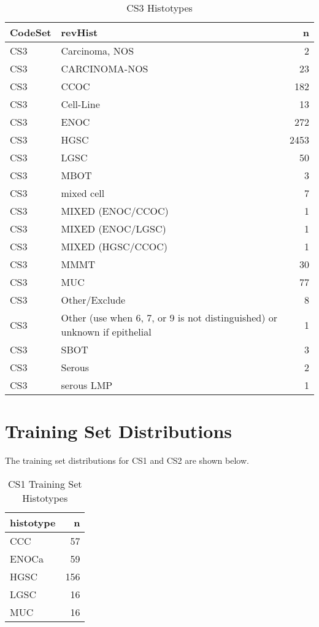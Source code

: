 \documentclass[
]{report}
\begin{document}
\begin{table}

\caption{\label{tab:dist-cs3}CS3 Histotypes}
\centering
\begin{tabular}[t]{l|l|r}
\hline
CodeSet & revHist & n\\
\hline
CS3 & Carcinoma, NOS & 2\\
\hline
CS3 & CARCINOMA-NOS & 23\\
\hline
CS3 & CCOC & 182\\
\hline
CS3 & Cell-Line & 13\\
\hline
CS3 & ENOC & 272\\
\hline
CS3 & HGSC & 2453\\
\hline
CS3 & LGSC & 50\\
\hline
CS3 & MBOT & 3\\
\hline
CS3 & mixed cell & 7\\
\hline
CS3 & MIXED (ENOC/CCOC) & 1\\
\hline
CS3 & MIXED (ENOC/LGSC) & 1\\
\hline
CS3 & MIXED (HGSC/CCOC) & 1\\
\hline
CS3 & MMMT & 30\\
\hline
CS3 & MUC & 77\\
\hline
CS3 & Other/Exclude & 8\\
\hline
CS3 & Other (use when 6, 7, or 9 is not distinguished) or unknown if epithelial & 1\\
\hline
CS3 & SBOT & 3\\
\hline
CS3 & Serous & 2\\
\hline
CS3 & serous LMP & 1\\
\hline
\end{tabular}
\end{table}

\hypertarget{training-set-distributions}{%
\section{Training Set Distributions}\label{training-set-distributions}}

The training set distributions for CS1 and CS2 are shown below.

\begin{table}

\caption{\label{tab:training-dist-cs1}CS1 Training Set Histotypes}
\centering
\begin{tabular}[t]{l|r}
\hline
histotype & n\\
\hline
CCC & 57\\
\hline
ENOCa & 59\\
\hline
HGSC & 156\\
\hline
LGSC & 16\\
\hline
MUC & 16\\
\hline
\end{tabular}
\end{table}
\end{document}
